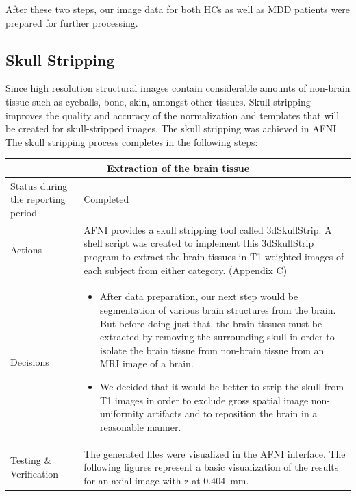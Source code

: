 \documentclass[12pt]{article}
\begin{document}
After these two steps, our image data for both HCs as well as MDD
patients were prepared for further processing.

\newpage
\subsection{Skull Stripping}

Since high resolution structural images contain considerable amounts
of non-brain tissue such as eyeballs, bone, skin, amongst other
tissues. Skull stripping improves the quality and accuracy of the
normalization and templates that will be created for skull-stripped
images. The skull stripping was achieved in AFNI. The skull stripping
process completes in the following steps:

\begin{table}[H]
  \centering
  \begin{tabular} {| m{3.3cm} | m{11.5cm} | }
    \hline
    \multicolumn{2}{|c|}{Extraction of the brain tissue} \\ \hline
    Status during the reporting period   & Completed   \\ \hline
    Actions &
    AFNI provides a skull stripping tool called 3dSkullStrip. A shell
    script was created to implement this 3dSkullStrip program to
    extract the brain tissues in T1 weighted images of each subject
    from either category. (Appendix C) \\ \hline

    Decisions &
    \begin{itemize}

      \item After data preparation, our next step would be
        segmentation of various brain structures from the brain. But
        before doing just that, the brain tissues must be extracted by
        removing the surrounding skull in order to isolate the brain
        tissue from non-brain tissue from an MRI image of a brain.

      \item We decided that it would be better to strip the skull
        from T1 images in order to exclude gross spatial image
        non-uniformity artifacts and to reposition the brain in a
        reasonable manner.

    \end{itemize} \\ \hline

    Testing \& Verification &
    The generated files were visualized in the AFNI interface. The
    following figures represent a basic visualization of the results
    for an axial image with z at 0.404~mm.



\end{tabular}
\end{table}
\end{document}
